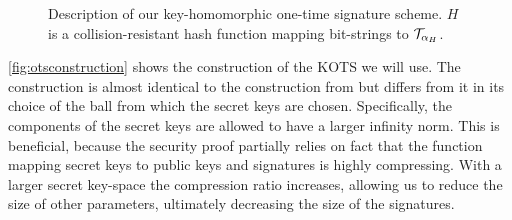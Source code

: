 \begin{figure}
\centering
\begin{pcvstack}
\begin{pchstack}[center]
  \pchspace
  \pchspace
  \end{pchstack}
  \pchspace
  \begin{pchstack}
  \begin{pcvstack}
  \pcvspace
  \pcvspace
  \end{pcvstack}
  \pchspace
\end{pchstack}
\end{pcvstack}
\caption{%
Description of our key-homomorphic one-time signature scheme.
$H$ is a collision-resistant hash function mapping bit-strings to $\mathcal{T}_{\alpha_H}$.%
}
\label{fig:otsconstruction}
\end{figure}

\autoref{fig:otsconstruction} shows the construction of the KOTS we will use.
The construction is almost identical to the construction from \cite{CCS:FleSimZha22} but differs from it in its choice of the ball from which the secret keys are chosen.
Specifically, the components of the secret keys are allowed to have a larger infinity norm.
This is beneficial, because the security proof partially relies on fact that the function mapping secret keys to public keys and signatures is highly compressing.
With a larger secret key-space the compression ratio increases, allowing us to reduce the size of other parameters, ultimately decreasing the size of the signatures.

